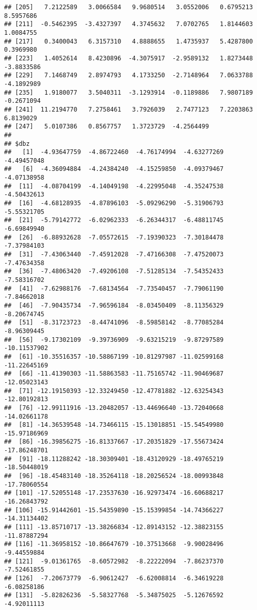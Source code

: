 \documentclass[
]{article}
\begin{document}
\begin{verbatim}
## [205]   7.2122589   3.0066584   9.9680514   3.0552006   0.6795213   8.5957686
## [211]  -0.5462395  -3.4327397   4.3745632   7.0702765   1.8144603   1.0084755
## [217]   0.3400043   6.3157310   4.8888655   1.4735937   5.4287800   0.3969980
## [223]   1.4052614   8.4230896  -4.3075917  -2.9589132   1.8273448  -3.8833586
## [229]   7.1468749   2.8974793   4.1733250  -2.7148964   7.0633788  -4.1892989
## [235]   1.9180077   3.5040311  -3.1293914  -0.1189886   7.9807189  -0.2671094
## [241]  11.2194770   7.2758461   3.7926039   2.7477123   7.2203863   6.8139029
## [247]   5.0107386   0.8567757   1.3723729  -4.2564499
## 
## $dbz
##   [1]  -4.93647759  -4.86722460  -4.76174994  -4.63277269  -4.49457048
##   [6]  -4.36094884  -4.24384240  -4.15259850  -4.09379467  -4.07138958
##  [11]  -4.08704199  -4.14049198  -4.22995048  -4.35247538  -4.50432613
##  [16]  -4.68128935  -4.87896103  -5.09296290  -5.31906793  -5.55321705
##  [21]  -5.79142772  -6.02962333  -6.26344317  -6.48811745  -6.69849940
##  [26]  -6.88932628  -7.05572615  -7.19390323  -7.30184478  -7.37984103
##  [31]  -7.43063440  -7.45912028  -7.47166308  -7.47520073  -7.47634358
##  [36]  -7.48063420  -7.49206108  -7.51285134  -7.54352433  -7.58316702
##  [41]  -7.62988176  -7.68134564  -7.73540457  -7.79061190  -7.84662018
##  [46]  -7.90435734  -7.96596184  -8.03450409  -8.11356329  -8.20674745
##  [51]  -8.31723723  -8.44741096  -8.59858142  -8.77085284  -8.96309445
##  [56]  -9.17302109  -9.39736909  -9.63215219  -9.87297589 -10.11537902
##  [61] -10.35516357 -10.58867199 -10.81297987 -11.02599168 -11.22645169
##  [66] -11.41390303 -11.58863583 -11.75165742 -11.90469687 -12.05023143
##  [71] -12.19150393 -12.33249450 -12.47781882 -12.63254343 -12.80192813
##  [76] -12.99111916 -13.20482057 -13.44696640 -13.72040668 -14.02661178
##  [81] -14.36539548 -14.73466115 -15.13018851 -15.54549980 -15.97186969
##  [86] -16.39856275 -16.81337667 -17.20351829 -17.55673424 -17.86248701
##  [91] -18.11288242 -18.30309401 -18.43120929 -18.49765219 -18.50448019
##  [96] -18.45483140 -18.35264118 -18.20256524 -18.00993848 -17.78060554
## [101] -17.52055148 -17.23537630 -16.92973474 -16.60688217 -16.26843792
## [106] -15.91442601 -15.54359890 -15.15399854 -14.74366227 -14.31134402
## [111] -13.85710717 -13.38266834 -12.89143152 -12.38823155 -11.87887294
## [116] -11.36958152 -10.86647679 -10.37513668  -9.90028496  -9.44559884
## [121]  -9.01361765  -8.60572982  -8.22222094  -7.86237370  -7.52461855
## [126]  -7.20673779  -6.90612427  -6.62008814  -6.34619228  -6.08258186
## [131]  -5.82826236  -5.58327768  -5.34875025  -5.12676592  -4.92011113

\end{verbatim}
\end{document}
